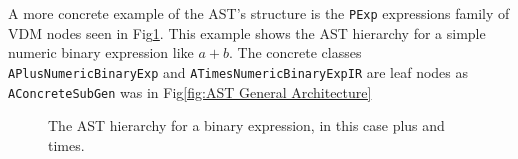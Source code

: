 A more concrete example of the AST's structure is the \lstinline[language=Java]{PExp} expressions family of VDM nodes seen in Fig\ref{fig:The AST hierarchy for a binary expression}. This example shows the AST hierarchy for a simple numeric binary expression like $a + b$. The concrete classes \lstinline[language=Java]{APlusNumericBinaryExp} and \lstinline[language=Java]{ATimesNumericBinaryExpIR} are leaf nodes as \lstinline[language=Java]{AConcreteSubGen} was in Fig\ref{fig:AST General Architecture}\begin{figure}
        \caption{\label{fig:The AST hierarchy for a binary expression} The AST hierarchy for a binary expression, in this case plus and times. \parencite{vdmwikiast}}
      \end{figure}

